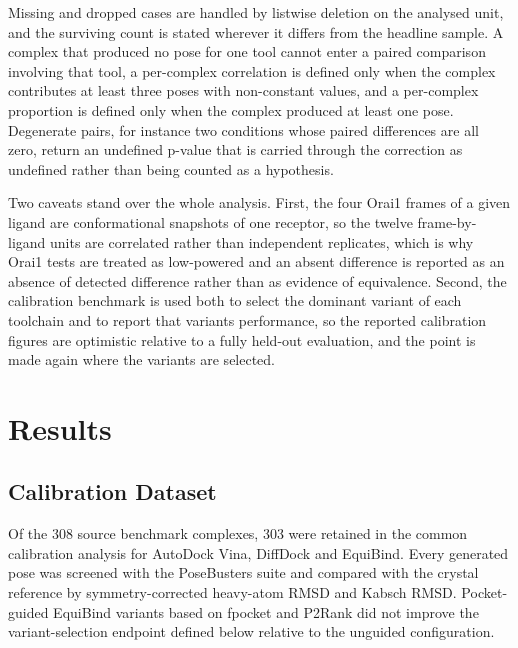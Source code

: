 Missing and dropped cases are handled by listwise deletion on the analysed unit, and the surviving count is stated wherever it differs from the headline sample. A complex that produced no pose for one tool cannot enter a paired comparison involving that tool, a per-complex correlation is defined only when the complex contributes at least three poses with non-constant values, and a per-complex proportion is defined only when the complex produced at least one pose. Degenerate pairs, for instance two conditions whose paired differences are all zero, return an undefined p-value that is carried through the correction as undefined rather than being counted as a hypothesis.

Two caveats stand over the whole analysis. First, the four Orai1 frames of a given ligand are conformational snapshots of one receptor, so the twelve frame-by-ligand units are correlated rather than independent replicates, which is why Orai1 tests are treated as low-powered and an absent difference is reported as an absence of detected difference rather than as evidence of equivalence. Second, the calibration benchmark is used both to select the dominant variant of each toolchain and to report that variant\textquotesingle s performance, so the reported calibration figures are optimistic relative to a fully held-out evaluation, and the point is made again where the variants are selected.

\hypertarget{results}{%
\chapter{Results}\label{results}}

\hypertarget{calibration-dataset-1}{%
\section{Calibration Dataset}\label{calibration-dataset-1}}

Of the 308 source benchmark complexes, 303 were retained in the common calibration analysis for AutoDock Vina, DiffDock and EquiBind. Every generated pose was screened with the PoseBusters suite and compared with the crystal reference by symmetry-corrected heavy-atom RMSD and Kabsch RMSD. Pocket-guided EquiBind variants based on fpocket and P2Rank did not improve the variant-selection endpoint defined below relative to the unguided configuration.

